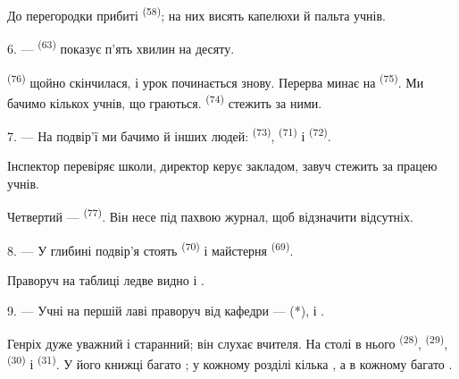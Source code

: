 До перегородки прибиті  \textsuperscript{(58)}; на них висять
капелюхи й пальта учнів.

\VUsaut{5.2mm}
\VUsaut{3.6mm}

6. ---  \textsuperscript{(63)} показує п'ять хвилин на десяту.

 \textsuperscript{(76)} щойно скінчилася, і урок починається
знову. Перерва минає на  \textsuperscript{(75)}. Ми бачимо
кількох учнів, що граються.  \textsuperscript{(74)} стежить за
ними.

7. --- На подвір'ї ми бачимо й інших людей: 
\textsuperscript{(73)},  \textsuperscript{(71)} і
 \textsuperscript{(72)}.

Інспектор перевіряє школи, директор керує закладом, завуч стежить за працею
учнів.

Четвертий ---  \textsuperscript{(77)}. Він несе під пахвою
журнал, щоб відзначити відсутніх.

8. --- У глибині подвір'я стоять 
\textsuperscript{(70)} і майстерня  \textsuperscript{(69)}.

Праворуч на таблиці ледве видно   і
.


\VUsaut{2.4mm}

\VUsaut{3.0mm}

9. --- Учні на першій лаві праворуч від кафедри ---  (*),
 і .

Генріх дуже уважний і старанний; він слухає вчителя. На столі в нього
 \textsuperscript{(28)},  \textsuperscript{(29)},
 \textsuperscript{(30)} і  \textsuperscript{(31)}.
У його книжці багато ; у кожному розділі кілька
, а в кожному  багато .

